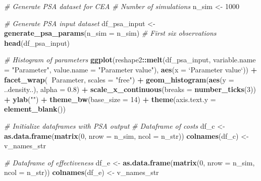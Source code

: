 \documentclass[
]{article}
\newenvironment{Shaded}{\begin{snugshade}}{\end{snugshade}}
\newcommand{\CommentTok}[1]{\textcolor[rgb]{0.56,0.35,0.01}{\textit{#1}}}
\newcommand{\DataTypeTok}[1]{\textcolor[rgb]{0.13,0.29,0.53}{#1}}
\newcommand{\DecValTok}[1]{\textcolor[rgb]{0.00,0.00,0.81}{#1}}
\newcommand{\FloatTok}[1]{\textcolor[rgb]{0.00,0.00,0.81}{#1}}
\newcommand{\KeywordTok}[1]{\textcolor[rgb]{0.13,0.29,0.53}{\textbf{#1}}}
\newcommand{\NormalTok}[1]{#1}
\newcommand{\OperatorTok}[1]{\textcolor[rgb]{0.81,0.36,0.00}{\textbf{#1}}}
\newcommand{\StringTok}[1]{\textcolor[rgb]{0.31,0.60,0.02}{#1}}
\begin{document}
\begin{Shaded}
\begin{Highlighting}[]
\CommentTok{# Generate PSA dataset for CEA}
\CommentTok{# Number of simulations}
\NormalTok{n_sim <-}\StringTok{ }\DecValTok{1000}

\CommentTok{# Generate PSA input dataset}
\NormalTok{df_psa_input <-}\StringTok{ }\KeywordTok{generate_psa_params}\NormalTok{(}\DataTypeTok{n_sim =}\NormalTok{ n_sim)}
\CommentTok{# First six observations}
\KeywordTok{head}\NormalTok{(df_psa_input)}

\CommentTok{# Histogram of parameters}
\KeywordTok{ggplot}\NormalTok{(reshape2}\OperatorTok{::}\KeywordTok{melt}\NormalTok{(df_psa_input, }\DataTypeTok{variable.name =} \StringTok{"Parameter"}\NormalTok{, }
                      \DataTypeTok{value.name =} \StringTok{"Parameter value"}\NormalTok{), }
                      \KeywordTok{aes}\NormalTok{(}\DataTypeTok{x =} \StringTok{`}\DataTypeTok{Parameter value}\StringTok{`}\NormalTok{)) }\OperatorTok{+}
\StringTok{                      }\KeywordTok{facet_wrap}\NormalTok{(}\OperatorTok{~}\NormalTok{Parameter, }\DataTypeTok{scales =} \StringTok{"free"}\NormalTok{) }\OperatorTok{+}
\StringTok{                      }\KeywordTok{geom_histogram}\NormalTok{(}\KeywordTok{aes}\NormalTok{(}\DataTypeTok{y =}\NormalTok{ ..density..), }\DataTypeTok{alpha =} \FloatTok{0.8}\NormalTok{) }\OperatorTok{+}
\StringTok{                      }\KeywordTok{scale_x_continuous}\NormalTok{(}\DataTypeTok{breaks =} \KeywordTok{number_ticks}\NormalTok{(}\DecValTok{3}\NormalTok{)) }\OperatorTok{+}
\StringTok{                      }\KeywordTok{ylab}\NormalTok{(}\StringTok{""}\NormalTok{) }\OperatorTok{+}
\StringTok{                      }\KeywordTok{theme_bw}\NormalTok{(}\DataTypeTok{base_size =} \DecValTok{14}\NormalTok{) }\OperatorTok{+}
\StringTok{                      }\KeywordTok{theme}\NormalTok{(}\DataTypeTok{axis.text.y =} \KeywordTok{element_blank}\NormalTok{())                    }

\CommentTok{# Initialize dataframes with PSA output }
\CommentTok{# Dataframe of costs}
\NormalTok{df_c <-}\StringTok{ }\KeywordTok{as.data.frame}\NormalTok{(}\KeywordTok{matrix}\NormalTok{(}\DecValTok{0}\NormalTok{, }
                      \DataTypeTok{nrow =}\NormalTok{ n_sim,}
                      \DataTypeTok{ncol =}\NormalTok{ n_str))}
\KeywordTok{colnames}\NormalTok{(df_c) <-}\StringTok{ }\NormalTok{v_names_str}

\CommentTok{# Dataframe of effectiveness}
\NormalTok{df_e <-}\StringTok{ }\KeywordTok{as.data.frame}\NormalTok{(}\KeywordTok{matrix}\NormalTok{(}\DecValTok{0}\NormalTok{, }
                      \DataTypeTok{nrow =}\NormalTok{ n_sim,}
                      \DataTypeTok{ncol =}\NormalTok{ n_str))}
\KeywordTok{colnames}\NormalTok{(df_e) <-}\StringTok{ }\NormalTok{v_names_str}
\end{Highlighting}
\end{Shaded}
\end{document}
